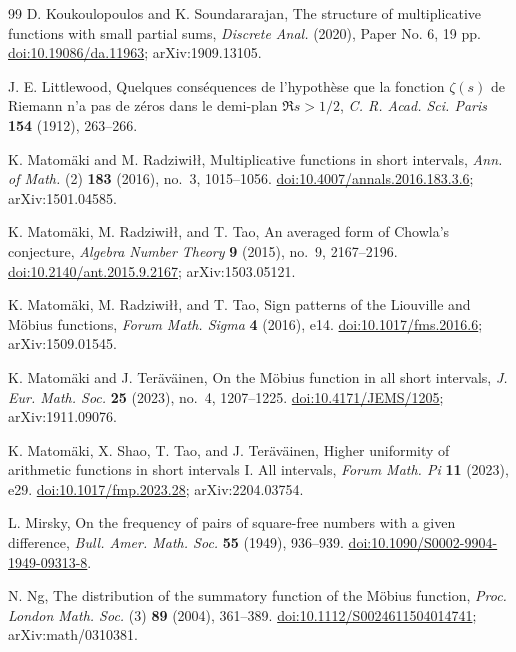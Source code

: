 \documentclass[11pt]{amsart}
\numberwithin{equation}{section}
\theoremstyle{plain}
\theoremstyle{definition}
\theoremstyle{remark}
\begin{document}
\begin{thebibliography}{99}
D. Koukoulopoulos and K. Soundararajan,
The structure of multiplicative functions with small partial sums,
\emph{Discrete Anal.} (2020), Paper No. 6, 19 pp.
\href{https://doi.org/10.19086/da.11963}{doi:10.19086/da.11963};
arXiv:1909.13105.

J. E. Littlewood,
Quelques cons\'equences de l'hypoth\`ese que la fonction $\zeta(s)$ de Riemann n'a pas de z\'eros dans le demi-plan
$\Re s>1/2$,
\emph{C. R. Acad. Sci. Paris} \textbf{154} (1912), 263--266.

K. Matom\"aki and M. Radziwi\l\l,
Multiplicative functions in short intervals,
\emph{Ann. of Math.} (2) \textbf{183} (2016), no.~3, 1015--1056.
\href{https://doi.org/10.4007/annals.2016.183.3.6}{doi:10.4007/annals.2016.183.3.6};
arXiv:1501.04585.

K. Matom\"aki, M. Radziwi\l\l, and T. Tao,
An averaged form of Chowla's conjecture,
\emph{Algebra Number Theory} \textbf{9} (2015), no.~9, 2167--2196.
\href{https://doi.org/10.2140/ant.2015.9.2167}{doi:10.2140/ant.2015.9.2167};
arXiv:1503.05121.

K. Matom\"aki, M. Radziwi\l\l, and T. Tao,
Sign patterns of the Liouville and M\"obius functions,
\emph{Forum Math. Sigma} \textbf{4} (2016), e14.
\href{https://doi.org/10.1017/fms.2016.6}{doi:10.1017/fms.2016.6};
arXiv:1509.01545.

K. Matom\"aki and J. Ter\"av\"ainen,
On the M\"obius function in all short intervals,
\emph{J. Eur. Math. Soc.} \textbf{25} (2023), no.~4, 1207--1225.
\href{https://doi.org/10.4171/JEMS/1205}{doi:10.4171/JEMS/1205};
arXiv:1911.09076.

K. Matom\"aki, X. Shao, T. Tao, and J. Ter\"av\"ainen,
Higher uniformity of arithmetic functions in short intervals I. All intervals,
\emph{Forum Math. Pi} \textbf{11} (2023), e29.
\href{https://doi.org/10.1017/fmp.2023.28}{doi:10.1017/fmp.2023.28};
arXiv:2204.03754.

L. Mirsky,
On the frequency of pairs of square-free numbers with a given difference,
\emph{Bull. Amer. Math. Soc.} \textbf{55} (1949), 936--939.
\href{https://doi.org/10.1090/S0002-9904-1949-09313-8}{doi:10.1090/S0002-9904-1949-09313-8}.

N. Ng,
The distribution of the summatory function of the M\"obius function,
\emph{Proc. London Math. Soc.} (3) \textbf{89} (2004), 361--389.
\href{https://doi.org/10.1112/S0024611504014741}{doi:10.1112/S0024611504014741};
arXiv:math/0310381.


\end{thebibliography}
\end{document}
